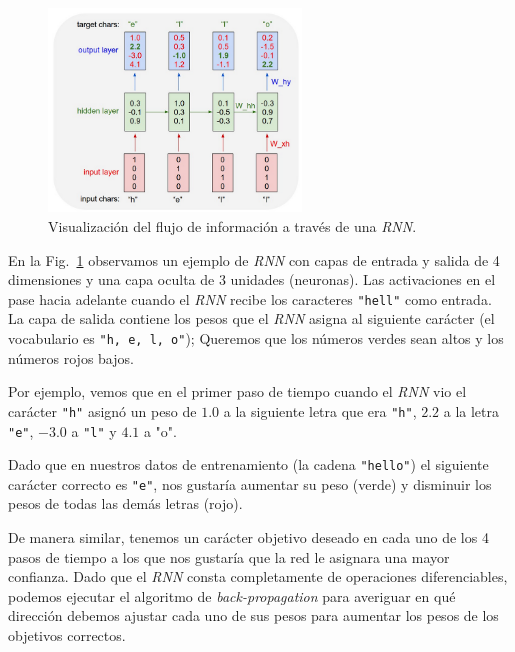 \documentclass[a4paper,12pt]{article}
\begin{document}
\begin{figure}[H]
	\begin{center}				
		\includegraphics[width=0.6\textwidth]{tesis_29.png}
		\caption{Visualización del flujo de información a través de una \textit{RNN}. \citep{karpathy:rnn}}
		\label{fig:rnnexample}
	\end{center}
\end{figure}

En la Fig.~\ref{fig:rnnexample} observamos un ejemplo de \textit{RNN} con capas de entrada y salida de 4 dimensiones y una capa oculta de 3 unidades (neuronas). Las activaciones en el pase hacia adelante cuando el \textit{RNN} recibe los caracteres \texttt{"hell"} como entrada. La capa de salida contiene los pesos que el \textit{RNN} asigna al siguiente carácter (el vocabulario es \texttt{"h, e, l, o"}); Queremos que los números verdes sean altos y los números rojos bajos.

Por ejemplo, vemos que en el primer paso de tiempo cuando el \textit{RNN} vio el carácter \texttt{"h"} asignó un peso de $1.0$ a la siguiente letra que era \texttt{"h"}, $2.2$ a la letra \texttt{"e"}, $-3.0$ a \texttt{"l"} y $4.1$ a "o". 

\clearpage

Dado que en nuestros datos de entrenamiento (la cadena \texttt{"hello"}) el siguiente carácter correcto es \texttt{"e"}, nos gustaría aumentar su peso (verde) y disminuir los pesos de todas las demás letras (rojo). 

De manera similar, tenemos un carácter objetivo deseado en cada uno de los 4 pasos de tiempo a los que nos gustaría que la red le asignara una mayor confianza. Dado que el \textit{RNN} consta completamente de operaciones diferenciables, podemos ejecutar el algoritmo de \textit{back-propagation} para averiguar en qué dirección debemos ajustar cada uno de sus pesos para aumentar los pesos de los objetivos correctos. 
\end{document}
